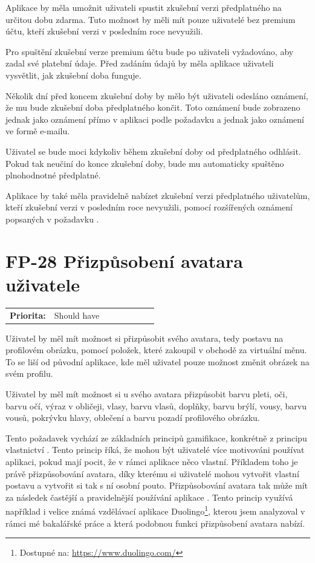 Aplikace by měla umožnit uživateli spustit zkušební verzi předplatného na určitou dobu zdarma. Tuto možnost by měli mít pouze uživatelé bez premium účtu, kteří zkušební verzi v posledním roce nevyužili.

Pro spuštění zkušební verze premium účtu bude po uživateli vyžadováno, aby zadal své platební údaje. Před zadáním údajů by měla aplikace uživateli vysvětlit, jak zkušební doba funguje.

Několik dní před koncem zkušební doby by mělo být uživateli odesláno oznámení, že mu bude zkušební doba předplatného končit. Toto oznámení bude zobrazeno jednak jako oznámení přímo v aplikaci podle požadavku  a jednak jako oznámení ve formě e-mailu.

Uživatel se bude moci kdykoliv během zkušební doby od předplatného odhlásit. Pokud tak neučiní do konce zkušební doby, bude mu automaticky spuštěno plnohodnotné předplatné.

Aplikace by také měla pravidelně nabízet zkušební verzi předplatného uživatelům, kteří zkušební verzi v posledním roce nevyužili, pomocí rozšířených oznámení popsaných v požadavku .

\section{FP-28 Přizpůsobení avatara uživatele}\label{sec:fp-avatar-customization}

\begin{tabular}{lp{0.7\linewidth}}
    \textbf{Priorita:} & Should have \\
\end{tabular}

Uživatel by měl mít možnost si přizpůsobit svého avatara, tedy postavu na profilovém obrázku, pomocí položek, které zakoupil v obchodě za virtuální měnu. To se liší od původní aplikace, kde měl uživatel pouze možnost změnit obrázek na svém profilu.

Uživatel by měl mít možnost si u svého avatara přizpůsobit barvu pleti, oči, barvu očí, výraz v obličeji, vlasy, barvu vlasů, doplňky, barvu brýlí, vousy, barvu vousů, pokrývku hlavy, oblečení a barvu pozadí profilového obrázku.

Tento požadavek vychází ze základních principů gamifikace, konkrétně z principu vlastnictví \cite{Chou2019ActionableGamification}. Tento princip říká, že mohou být uživatelé více motivováni používat aplikaci, pokud mají pocit, že v rámci aplikace něco vlastní. Příkladem toho je právě přizpůsobování avatara, díky kterému si uživatelé mohou vytvořit vlastní postavu a vytvořit si tak s ní osobní pouto. Přizpůsobování avatara tak může mít za následek častější a pravidelnější používání aplikace \cite{Birk2018CombatingAttrition}. Tento princip využívá například i velice známá vzdělávací aplikace Duolingo\footnote{Dostupné na: \href{https://www.duolingo.com/}{https://www.duolingo.com/}}, kterou jsem analyzoval v rámci mé bakalářské práce \cite{Jenicek2024BachelorThesis} a která podobnou funkci přizpůsobení avatara nabízí.


